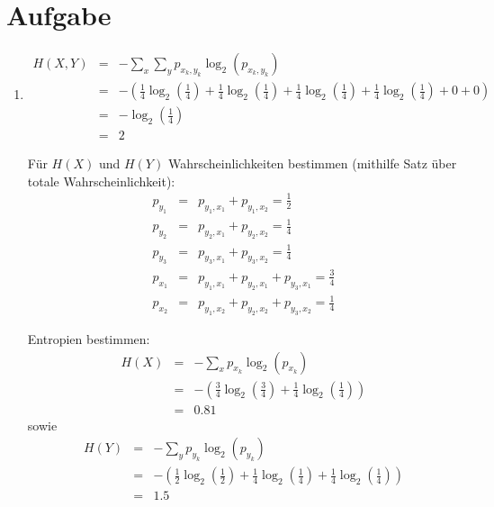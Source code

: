 \documentclass[DIN, pagenumber=false, fontsize=11pt, parskip=half]{scrartcl}
\begin{document}
    \section{Aufgabe}
    \begin{enumerate}[label=(\alph*)]
        \item 
            \begin{eqnarray*}
                H(X, Y) &=& -\sum_x \sum_y p_{x_k, y_k} \log_2(p_{x_k, y_k}) \\
                        &=& -\left(\frac{1}{4} \log_2\left(\frac{1}{4}\right) +\frac{1}{4} \log_2\left(\frac{1}{4}\right) +\frac{1}{4} \log_2\left(\frac{1}{4}\right) +\frac{1}{4} \log_2\left(\frac{1}{4}\right) + 0 + 0\right) \\
                        &=& -\log_2\left(\frac{1}{4}\right) \\
                        &=& 2 
            \end{eqnarray*}

            Für $H(X)$ und $H(Y)$ Wahrscheinlichkeiten bestimmen (mithilfe Satz über totale Wahrscheinlichkeit):
            \begin{eqnarray*}
                p_{y_1} &=& p_{y_1, x_1} + p_{y_1, x_2} = \frac{1}{2} \\
                p_{y_2} &=& p_{y_2, x_1} + p_{y_2, x_2} = \frac{1}{4} \\
                p_{y_3} &=& p_{y_3, x_1} + p_{y_3, x_2} = \frac{1}{4} \\
                p_{x_1} &=& p_{y_1, x_1} + p_{y_2, x_1} + p_{y_3, x_1} = \frac{3}{4} \\
                p_{x_2} &=& p_{y_1, x_2} + p_{y_2, x_2} + p_{y_3, x_2} = \frac{1}{4}
            \end{eqnarray*}

            Entropien bestimmen:
            \begin{eqnarray*}
                H(X) &=& -\sum_x p_{x_k} \log_2(p_{x_k}) \\
                    &=& -\left(\frac{3}{4} \log_2\left(\frac{3}{4}\right) + \frac{1}{4} \log_2\left(\frac{1}{4}\right)\right) \\
                    &=& 0.81
            \end{eqnarray*}
            sowie
            \begin{eqnarray*}
                H(Y) &=& -\sum_y p_{y_k} \log_2(p_{y_k}) \\
                    &=& -\left(\frac{1}{2} \log_2\left(\frac{1}{2}\right) +\frac{1}{4} \log_2\left(\frac{1}{4}\right) +\frac{1}{4} \log_2\left(\frac{1}{4}\right)\right) \\
                    &=& 1.5
            \end{eqnarray*}


\end{enumerate}
\end{document}

